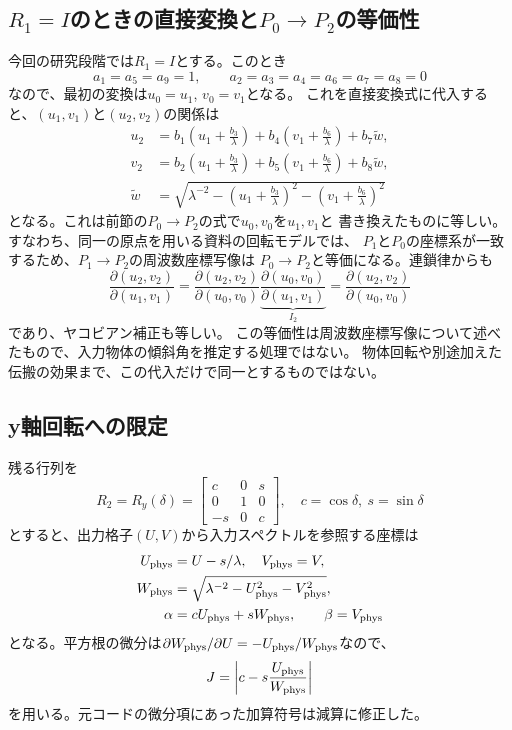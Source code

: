\documentclass[a4paper,10pt]{ltjsarticle}
\begin{document}
\subsection{$R_1=I$のときの直接変換と$P_0\to P_2$の等価性}
今回の研究段階では$R_1=I$とする。このとき
\begin{equation}
 a_1=a_5=a_9=1,\qquad
 a_2=a_3=a_4=a_6=a_7=a_8=0
\end{equation}
なので、最初の変換は$u_0=u_1$, $v_0=v_1$となる。
これを直接変換式に代入すると、$(u_1,v_1)$と$(u_2,v_2)$の関係は
\begin{align}
 u_2&=b_1\left(u_1+\frac{b_3}{\lambda}\right)
      +b_4\left(v_1+\frac{b_6}{\lambda}\right)+b_7\widetilde w,\\
 v_2&=b_2\left(u_1+\frac{b_3}{\lambda}\right)
      +b_5\left(v_1+\frac{b_6}{\lambda}\right)+b_8\widetilde w,\\
 \widetilde w&=\sqrt{\lambda^{-2}
             -\left(u_1+\frac{b_3}{\lambda}\right)^2
             -\left(v_1+\frac{b_6}{\lambda}\right)^2}
\end{align}
となる。これは前節の$P_0\to P_2$の式で$u_0,v_0$を$u_1,v_1$と
書き換えたものに等しい。すなわち、同一の原点を用いる資料の回転モデルでは、
$P_1$と$P_0$の座標系が一致するため、$P_1\to P_2$の周波数座標写像は
$P_0\to P_2$と等価になる。連鎖律からも
\begin{equation}
 \frac{\partial(u_2,v_2)}{\partial(u_1,v_1)}
 =\frac{\partial(u_2,v_2)}{\partial(u_0,v_0)}
  \underbrace{\frac{\partial(u_0,v_0)}{\partial(u_1,v_1)}}_{I_2}
 =\frac{\partial(u_2,v_2)}{\partial(u_0,v_0)}
\end{equation}
であり、ヤコビアン補正も等しい。
この等価性は周波数座標写像について述べたもので、入力物体の傾斜角を推定する処理ではない。
物体回転や別途加えた伝搬の効果まで、この代入だけで同一とするものではない。

\subsection{y軸回転への限定}
残る行列を
\begin{equation}
 R_2=R_y(\delta)=\begin{bmatrix}c&0&s\\0&1&0\\-s&0&c\end{bmatrix},
 \quad c=\cos\delta,\ s=\sin\delta
\end{equation}
とすると、出力格子$(U,V)$から入力スペクトルを参照する座標は
\begin{align}
 U_{\rm phys}&=U-s/\lambda,\quad V_{\rm phys}=V,\\
 W_{\rm phys}&=\sqrt{\lambda^{-2}-U_{\rm phys}^2-V_{\rm phys}^2},\\
 \alpha&=cU_{\rm phys}+sW_{\rm phys},\qquad \beta=V_{\rm phys}
\end{align}
となる。平方根の微分は$\partial W_{\rm phys}/\partial U=-U_{\rm phys}/W_{\rm phys}$なので、
\begin{equation}
 J=\left|c-s\frac{U_{\rm phys}}{W_{\rm phys}}\right|
\end{equation}
を用いる。元コードの微分項にあった加算符号は減算に修正した。
\end{document}
